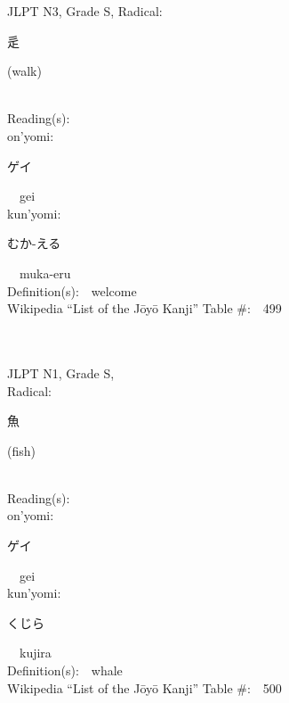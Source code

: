 \begin{multicols}{2}
{JLPT N3, Grade S, Radical:\ \ {\begin{CJK}{UTF8}{min} 辵 \end{CJK}} (walk) } \\
Reading(s):\ \ \\
{\hspace*{1em}}on'yomi:\ \ \\
{\hspace*{2em}}{\begin{CJK}{UTF8}{min} ゲイ \end{CJK}}\ \ gei\ \ \\
{\hspace*{1em}}kun'yomi:\ \ \\
{\hspace*{2em}}{\begin{CJK}{UTF8}{min} むか-える \end{CJK}}\ \ muka-eru\ \ \\
Definition(s):\ \ welcome \\
Wikipedia ``List of the J\=oy\=o Kanji'' Table \#:\ \ 499 \\
\ \ \\
{\fontsize{34pt}{40pt}  }\ \ \\
{JLPT N1, Grade S, \\Radical:\ \ {\begin{CJK}{UTF8}{min} 魚 \end{CJK}} (fish) } \\
Reading(s):\ \ \\
{\hspace*{1em}}on'yomi:\ \ \\
{\hspace*{2em}}{\begin{CJK}{UTF8}{min} ゲイ \end{CJK}}\ \ gei\ \ \\
{\hspace*{1em}}kun'yomi:\ \ \\
{\hspace*{2em}}{\begin{CJK}{UTF8}{min} くじら \end{CJK}}\ \ kujira\ \ \\
Definition(s):\ \ whale \\
Wikipedia ``List of the J\=oy\=o Kanji'' Table \#:\ \ 500 \\
\ \ \\
{\fontsize{34pt}{40pt}  }\ \ \\

\end{multicols}
